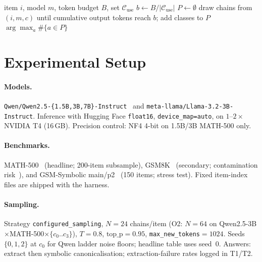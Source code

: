 \documentclass{article}
\begin{document}
\begin{algorithm}[t]
\caption{Configuration-Diversified Voting (CDV)}
\label{alg:cdv}
\begin{algorithmic}[1]
\Require item $i$, model $m$, token budget $B$, set $\mathcal{C}_{\mathrm{use}}$
\State $b \gets B / |\mathcal{C}_{\mathrm{use}}|$
\State $P \gets \emptyset$
  \State draw chains from $(i,m,c)$ until cumulative output tokens reach $b$; add classes to $P$
\EndFor
\State \Return $\arg\max_{a}\#\{a\in P\}$
\end{algorithmic}
\end{algorithm}

\section{Experimental Setup}
\label{sec:setup}

\paragraph{Models.}
\texttt{Qwen/Qwen2.5-\{1.5B,3B,7B\}-Instruct}~\citep{qwen25,qwen2} and
\texttt{meta-llama/Llama-3.2-3B-Instruct}. Inference with Hugging Face
\texttt{float16}, \texttt{device\_map=auto}, on $1$--$2\times$ NVIDIA T4 (16\,GB).
Precision control: NF4 4-bit on 1.5B/3B MATH-500 only.

\paragraph{Benchmarks.}
MATH-500~\citep{math500} (headline; 200-item subsample), GSM8K~\citep{cobbe2021gsm8k}
(secondary; contamination risk~\citep{zhang2024gsm1k}), and GSM-Symbolic
main/p2~\citep{mirzadeh2025gsmsymbolic} (150 items; stress test). Fixed item-index
files are shipped with the harness.

\paragraph{Sampling.}
Strategy \texttt{configured\_sampling}, $N{=}24$ chains/item (O2: $N{=}64$ on
Qwen2.5-3B$\times$MATH-500$\times\{c_0..c_3\}$), $T{=}0.8$, $\mathrm{top\_p}{=}0.95$,
\texttt{max\_new\_tokens}${=}1024$. Seeds $\{0,1,2\}$ at $c_0$ for Qwen ladder
noise floors; headline table uses seed~$0$. Answers: extract then symbolic
canonicalisation; extraction-failure rates logged in T1/T2.
\end{document}
